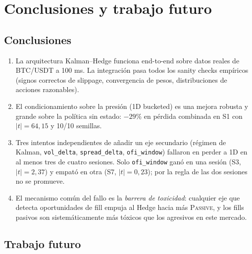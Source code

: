 \documentclass[journal,onecolumn,11pt]{IEEEtran}
\begin{document}
\section{Conclusiones y trabajo futuro}\label{sec:conclusiones}

\subsection{Conclusiones}

\begin{enumerate}
\item La arquitectura Kalman--Hedge funciona end-to-end sobre datos
      reales de BTC/USDT a 100 ms. La integración pasa todos los
      sanity checks empíricos (signos correctos de slippage,
      convergencia de pesos, distribuciones de acciones razonables).
\item El condicionamiento sobre la presión (1D bucketed) es una
      mejora robusta y grande sobre la política sin estado:
      $-29\%$ en pérdida combinada en S1 con $|t|=64{,}15$ y 10/10
      semillas.
\item Tres intentos independientes de añadir un eje secundario
      (régimen de Kalman, \texttt{vol\_delta}, \texttt{spread\_delta},
      \texttt{ofi\_window}) fallaron en perder a 1D en al menos
      tres de cuatro sesiones. Solo \texttt{ofi\_window} ganó en
      una sesión (S3, $|t|=2{,}37$) y empató en otra (S7,
      $|t|=0{,}23$); por la regla de las dos sesiones no se promueve.
\item El mecanismo común del fallo es la \emph{barrera de toxicidad}:
      cualquier eje que detecta oportunidades de fill empuja al
      Hedge hacia más \textsc{Passive}, y los fills pasivos son
      sistemáticamente más tóxicos que los agresivos en este mercado.
\end{enumerate}

\subsection{Trabajo futuro}
\end{document}
